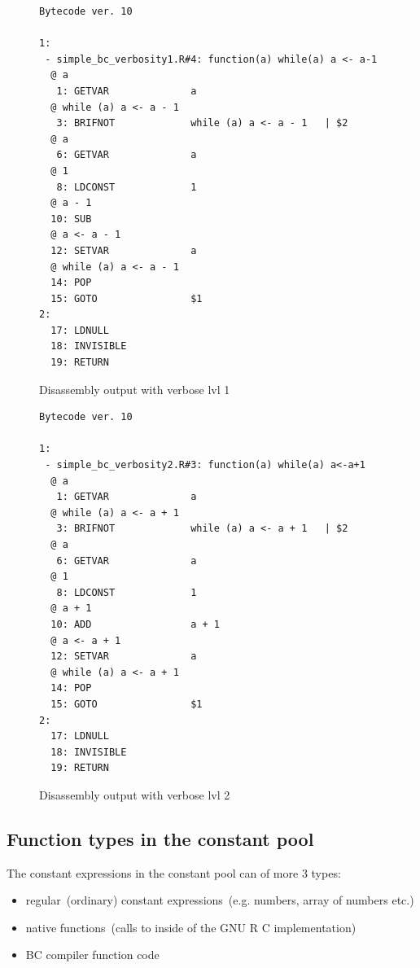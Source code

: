 \documentclass[thesis=M,english]{FITthesis}[2018/10/20]
\begin{document}
\begin{figure}[h]
\begin{lstlisting}
Bytecode ver. 10

1:
 - simple_bc_verbosity1.R#4: function(a) while(a) a <- a-1
  @ a
   1: GETVAR              a
  @ while (a) a <- a - 1
   3: BRIFNOT             while (a) a <- a - 1	 | $2
  @ a
   6: GETVAR              a
  @ 1
   8: LDCONST             1
  @ a - 1
  10: SUB                 
  @ a <- a - 1
  12: SETVAR              a
  @ while (a) a <- a - 1
  14: POP                 
  15: GOTO                $1
2:
  17: LDNULL              
  18: INVISIBLE           
  19: RETURN              
\end{lstlisting}
	\caption{Disassembly output with verbose lvl 1}\label{fig:disassembly-verbose-1}
\end{figure}

\begin{figure}[h]
\begin{lstlisting}
Bytecode ver. 10

1:
 - simple_bc_verbosity2.R#3: function(a) while(a) a<-a+1
  @ a
   1: GETVAR              a
  @ while (a) a <- a + 1
   3: BRIFNOT             while (a) a <- a + 1	 | $2
  @ a
   6: GETVAR              a
  @ 1
   8: LDCONST             1
  @ a + 1
  10: ADD                 a + 1
  @ a <- a + 1
  12: SETVAR              a
  @ while (a) a <- a + 1
  14: POP                 
  15: GOTO                $1
2:
  17: LDNULL              
  18: INVISIBLE           
  19: RETURN
\end{lstlisting}
	\caption{Disassembly output with verbose lvl 2}\label{fig:disassembly-verbose-2}
\end{figure}


\subsection{Function types in the constant pool}

The constant expressions in the constant pool can of more 3 types:

\begin{itemize}
	\item regular~(ordinary) constant expressions~(e.g. numbers, array of numbers etc.)
	\item native functions~(calls to inside of the GNU R C implementation)
	\item BC compiler function code
\end{itemize}
\end{document}
